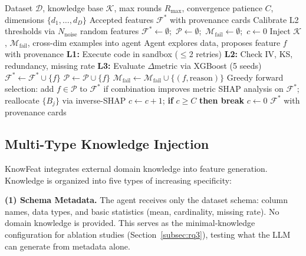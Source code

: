 \begin{algorithm}[t]
\caption{KnowFeat: Knowledge-Guided Feature Engineering}
\label{alg:knowfeat}
\small
\begin{algorithmic}[1]
\REQUIRE Dataset $\mathcal{D}$, knowledge base $\mathcal{K}$, max rounds $R_{\max}$, convergence patience $C$, dimensions $\{d_1,\ldots,d_D\}$
\ENSURE Accepted features $\mathcal{F}^*$ with provenance cards
\STATE Calibrate L2 thresholds via $N_{\text{noise}}$ random features
\STATE $\mathcal{F}^* \leftarrow \emptyset$;\, $\mathcal{P} \leftarrow \emptyset$;\, $\mathcal{M}_{\text{fail}} \leftarrow \emptyset$;\, $c \leftarrow 0$
\STATE Inject $\mathcal{K}$, $\mathcal{M}_{\text{fail}}$, cross-dim examples into agent
\STATE Agent explores data, proposes feature $f$ with provenance
\STATE \textbf{L1:} Execute code in sandbox ($\leq$2 retries)
\STATE \textbf{L2:} Check IV, KS, redundancy, missing rate
\STATE \textbf{L3:} Evaluate $\Delta$metric via XGBoost (5 seeds)
\STATE $\mathcal{F}^* \leftarrow \mathcal{F}^* \cup \{f\}$
\ELSE
\STATE $\mathcal{P} \leftarrow \mathcal{P} \cup \{f\}$ 
\ENDIF
\ELSE
\STATE $\mathcal{M}_{\text{fail}} \leftarrow \mathcal{M}_{\text{fail}} \cup \{(f, \text{reason})\}$
\ENDIF
\ENDIF
\ENDFOR
\ENDFOR
\STATE Greedy forward selection: add $f \in \mathcal{P}$ to $\mathcal{F}^*$ if combination improves metric
\STATE SHAP analysis on $\mathcal{F}^*$; reallocate $\{B_j\}$ via inverse-SHAP
\STATE $c \leftarrow c + 1$; \textbf{if} $c \geq C$ \textbf{then break}
\ELSE
\STATE $c \leftarrow 0$
\ENDIF
\ENDFOR
\RETURN $\mathcal{F}^*$ with provenance cards
\end{algorithmic}
\end{algorithm}

\subsection{Multi-Type Knowledge Injection}
\label{subsec:knowledge}

KnowFeat integrates external domain knowledge into feature generation. Knowledge is organized into five types of increasing specificity:

\textbf{(1) Schema Metadata.} The agent receives only the dataset schema: column names, data types, and basic statistics (mean, cardinality, missing rate). No domain knowledge is provided. This serves as the minimal-knowledge configuration for ablation studies (Section~\ref{subsec:rq3}), testing what the LLM can generate from metadata alone.

